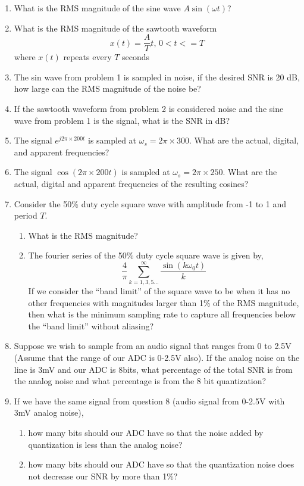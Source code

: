 \begin{enumerate}

\item What is the RMS magnitude of the sine wave $A\sin(\omega t)$?

\item What is the RMS magnitude of the sawtooth waveform 
\begin{equation*}
			x(t) = \frac{A}{T} t\text{,        } 0<t<=T
\end{equation*}
			where $x(t)$ repeats every $T$ seconds

\item The sin wave from problem 1 is sampled in noise, 
			if the desired SNR is 20 dB, how large can the RMS magnitude of the noise be?

\item If the sawtooth waveform from problem 2 is considered noise and
			the sine wave from problem 1 is the signal, what is the SNR in dB?

\item The signal $e^{j 2\pi \times200 t}$ is sampled at $\omega_s=2\pi\times300$. 
			What are the actual, digital, and apparent frequencies?

\item The signal $\cos( 2\pi \times200 t)$ is sampled at $\omega_s=2\pi\times250$.
			What are the actual, digital and apparent frequencies of the resulting cosines?

\item Consider the 50\% duty cycle square wave with amplitude from -1 to 1 and period $T$.
\begin{enumerate}
\item What is the RMS magnitude?
\item The fourier series of the 50\% duty cycle square wave is given by,
\begin{equation*}
\frac{4}{\pi} \sum_{k=1,3,5...}^\infty \frac{\sin(k \omega_0 t)}{k}
\end{equation*}			
If we consider the ``band limit'' of the square wave to be when it has no other frequencies with magnitudes larger than 1\% of the RMS magnitude, then what is the minimum sampling rate to capture all frequencies below the ``band limit'' without aliasing?
	\end{enumerate}
\item Suppose we wish to sample from an audio signal that ranges from 0 to 2.5V (Assume that the range of our ADC is 0-2.5V also). If the analog noise on the line is 3mV and our ADC is 8bits, what percentage of the total SNR is from the analog noise and what percentage is from the 8 bit quantization?
\item If we have the same signal from question 8 (audio signal from 0-2.5V with 3mV analog noise), 
	\begin{enumerate}
			\item how many bits should our ADC have so that the noise added by quantization is less than the analog noise?
			\item how many bits should our ADC have so that the quantization noise does not decrease our SNR by more than 1\%?
	\end{enumerate}


\end{enumerate}
